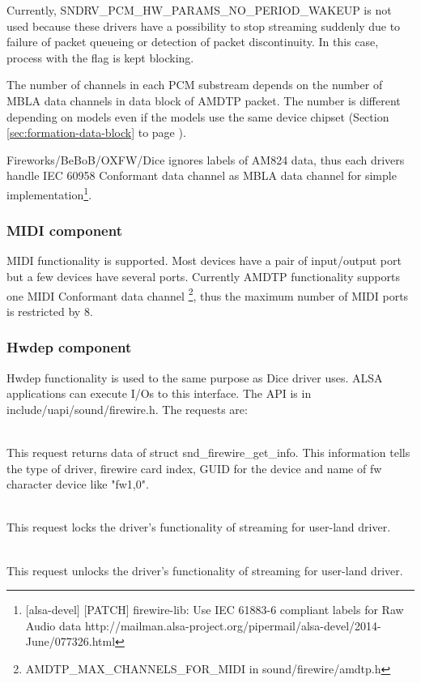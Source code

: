 \documentclass[onecolumn]{jarticle}
\begin{document}
Currently, SNDRV\_PCM\_HW\_PARAMS\_NO\_PERIOD\_WAKEUP is not used because these drivers have a possibility to stop streaming suddenly due to failure of packet queueing or detection of packet discontinuity. In this case, process with the flag is kept blocking.

The number of channels in each PCM substream depends on the number of MBLA data channels in data block of AMDTP packet. The number is different depending on models even if the models use the same device chipset (Section \ref{sec:formation-data-block} to page \pageref{sec:formation-data-block}).

Fireworks/BeBoB/OXFW/Dice ignores labels of AM824 data, thus each drivers handle IEC 60958 Conformant data channel as MBLA data channel for simple implementation\footnote{[alsa-devel] [PATCH] firewire-lib: Use IEC 61883-6 compliant labels for Raw Audio data http://mailman.alsa-project.org/pipermail/alsa-devel/2014-June/077326.html}.

\subsubsection{MIDI component}

MIDI functionality is supported. Most devices have a pair of input/output port but a few devices have several ports. Currently AMDTP functionality supports one MIDI Conformant data channel \footnote{AMDTP\_MAX\_CHANNELS\_FOR\_MIDI in sound/firewire/amdtp.h}, thus the maximum number of MIDI ports is restricted by 8.

\subsubsection{Hwdep component}
Hwdep functionality is used to the same purpose as Dice driver uses. ALSA applications can execute I/Os to this interface. The API is in include/uapi/sound/firewire.h. The requests are:

\begin{description}
\small
\item [SNDRV\_FIREWIRE\_IOCTL\_GET\_INFO] \mbox{} \\
This request returns data of struct snd\_firewire\_get\_info. This information tells the type of driver, firewire card index, GUID for the device and name of fw character device like "fw1,0".
\item [SNDRV\_FIREWIRE\_IOCTL\_LOCK] \mbox{} \\
This request locks the driver's functionality of streaming for user-land driver.
\item [SNDRV\_FIREWIRE\_IOCTL\_UNLOCK] \mbox{} \\
This request unlocks the driver's functionality of streaming for user-land driver.
\end{description}
\end{document}
